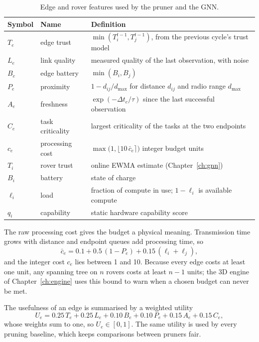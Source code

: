 \begin{table}[htbp]
\centering
\caption{Edge and rover features used by the pruner and the GNN.}
\label{tab:arch:features}
\small
\begin{tabularx}{\linewidth}{@{}l l X@{}}
\toprule
Symbol & Name & Definition \\
\midrule
$T_e$ & edge trust & $\min(T_i^{t-1},T_j^{t-1})$, from the previous cycle's trust model \\
$L_e$ & link quality & measured quality of the last observation, with noise \\
$B_e$ & edge battery & $\min(B_i,B_j)$ \\
$P_e$ & proximity & $1-d_{ij}/d_{\max}$ for distance $d_{ij}$ and radio range $d_{\max}$ \\
$A_e$ & freshness & $\exp(-\Delta t_e/\tau)$ since the last successful observation \\
$C_e$ & task criticality & largest criticality of the tasks at the two endpoints \\
$c_e$ & processing cost & $\max\bigl(1,\lfloor 10\,\bar c_e\rceil\bigr)$ integer budget units \\
\midrule
$T_i$ & rover trust & online EWMA estimate (Chapter~\ref{ch:gnn}) \\
$B_i$ & battery & state of charge \\
$\ell_i$ & load & fraction of compute in use; $1-\ell_i$ is available compute \\
$q_i$ & capability & static hardware capability score \\
\bottomrule
\end{tabularx}
\end{table}

The raw processing cost gives the budget a physical meaning. Transmission time
grows with distance and endpoint queues add processing time, so
\begin{equation}
\bar c_e=0.1+0.5\,(1-P_e)+0.15\,(\ell_i+\ell_j),
\label{eq:arch:cost}
\end{equation}
and the integer cost $c_e$ lies between 1 and 10. Because every edge costs at
least one unit, any spanning tree on $n$ rovers costs at least $n-1$ units; the
3D engine of Chapter~\ref{ch:engine} uses this bound to warn when a chosen
budget can never be met.

The usefulness of an edge is summarised by a weighted utility
\begin{equation}
U_e=0.25\,T_e+0.25\,L_e+0.10\,B_e+0.10\,P_e+0.15\,A_e+0.15\,C_e,
\label{eq:arch:utility}
\end{equation}
whose weights sum to one, so $U_e\in[0,1]$. The same utility is used by every
pruning baseline, which keeps comparisons between pruners fair.

